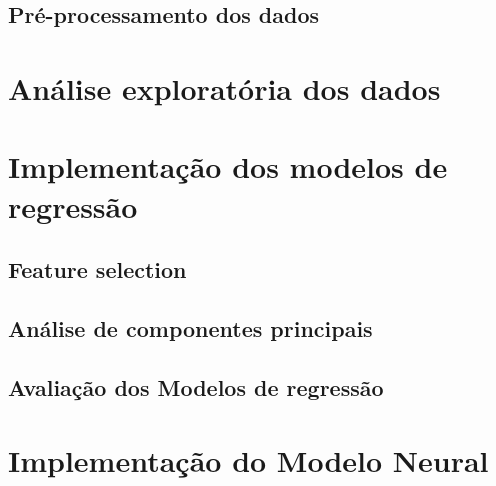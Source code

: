\subsection{Pré-processamento dos dados}


\section{Análise exploratória dos dados}


\section{Implementação dos modelos de regressão}


\subsection{Feature selection}


\subsection{Análise de componentes principais}


\subsection{Avaliação dos Modelos de regressão}


\section{Implementação do Modelo Neural}


